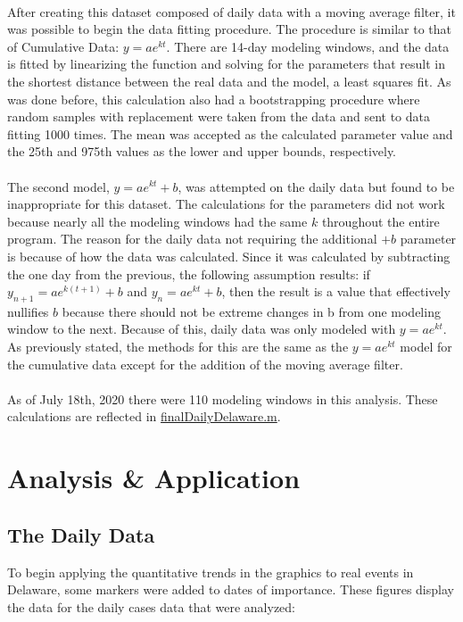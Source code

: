 \documentclass[12pt]{article}
\begin{document}
\paragraph{} After creating this dataset composed of daily data with a moving average filter, it was possible to begin the data fitting procedure. The procedure is similar to that of Cumulative Data: $y = ae^{kt}$. There are 14-day modeling windows, and the data is fitted by linearizing the function and solving for the parameters that result in the shortest distance between the real data and the model, a least squares fit. As was done before, this calculation also had a bootstrapping procedure where random samples with replacement were taken from the data and sent to data fitting 1000 times. The mean was accepted as the calculated parameter value and the 25th and 975th values as the lower and upper bounds, respectively.
\paragraph{} The second model, $y = ae ^ {kt} + b$, was attempted on the daily data but found to be inappropriate for this dataset. The calculations for the parameters did not work because nearly all the modeling windows had the same $k$ throughout the entire program. The reason for the daily data not requiring the additional $+b$ parameter is because of how the data was calculated. Since it was calculated by subtracting the one day from the previous, the following assumption results: if $y_{n+1} = ae^{k(t+1)} + b$ and $y_{n} = ae^{kt} + b$, then the result is a value that effectively nullifies $b$ because there should not be extreme changes in b from one modeling window to the next. Because of this, daily data was only modeled with $y = ae^{kt}$. As previously stated, the methods for this are the same as the $y = ae^{kt}$ model for the cumulative data except for the addition of the moving average filter.
\paragraph{} As of July 18th, 2020 there were 110 modeling windows in this analysis. These calculations are reflected in \href{https://github.com/tatabas/delaware-covid-analysis}{finalDailyDelaware.m}.

\section{Analysis \& Application}
\subsection{The Daily Data}
To begin applying the quantitative trends in the graphics to real events in Delaware, some markers were added to dates of importance. These figures display the data for the daily cases data that were analyzed:
\end{document}
